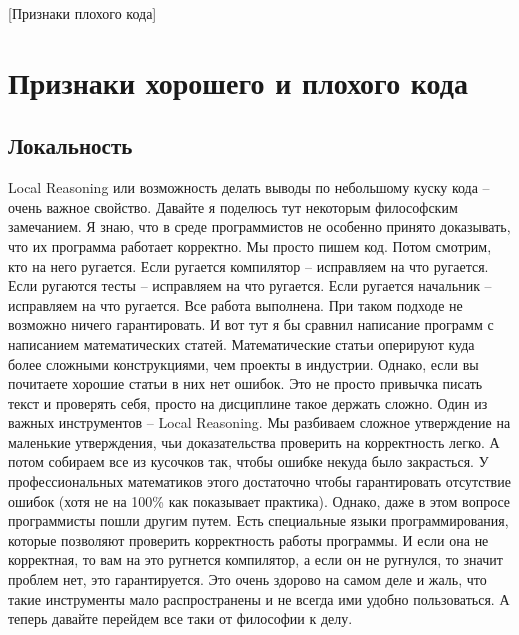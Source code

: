 [Признаки плохого кода]


\section{Признаки хорошего и плохого кода}

\subsection{Локальность}
\label{section::Locality}

Local Reasoning или возможность делать выводы по небольшому куску кода -- очень важное свойство.
Давайте я поделюсь тут некоторым философским замечанием.
Я знаю, что в среде программистов не особенно принято доказывать, что их программа работает корректно.
Мы просто пишем код.
Потом смотрим, кто на него ругается.
Если ругается компилятор -- исправляем на что ругается.
Если ругаются тесты -- исправляем на что ругается.
Если ругается начальник -- исправляем на что ругается.
Все работа выполнена.
При таком подходе не возможно ничего гарантировать.
И вот тут я бы сравнил написание программ с написанием математических статей.
Математические статьи оперируют куда более сложными конструкциями, чем проекты в индустрии.
Однако, если вы почитаете хорошие статьи в них нет ошибок.
Это не просто привычка писать текст и проверять себя, просто на дисциплине такое держать сложно.
Один из важных инструментов -- Local Reasoning.
Мы разбиваем сложное утверждение на маленькие утверждения, чьи доказательства проверить на корректность легко.
А потом собираем все из кусочков так, чтобы ошибке некуда было закрасться.
У профессиональных математиков этого достаточно чтобы гарантировать отсутствие ошибок (хотя не на 100\% как показывает практика).
Однако, даже в этом вопросе программисты пошли другим путем.
Есть специальные языки программирования, которые позволяют проверить корректность работы программы.
И если она не корректная, то вам на это ругнется компилятор, а если он не ругнулся, то значит проблем нет, это гарантируется.
Это очень здорово на самом деле и жаль, что такие инструменты мало распространены и не всегда ими удобно пользоваться.
А теперь давайте перейдем все таки от философии к делу.



